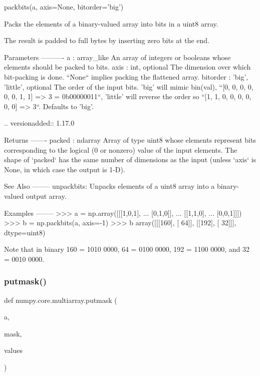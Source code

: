 \begin{DoxyVerb}packbits(a, axis=None, bitorder='big')

Packs the elements of a binary-valued array into bits in a uint8 array.

The result is padded to full bytes by inserting zero bits at the end.

Parameters
----------
a : array_like
    An array of integers or booleans whose elements should be packed to
    bits.
axis : int, optional
    The dimension over which bit-packing is done.
    ``None`` implies packing the flattened array.
bitorder : {'big', 'little'}, optional
    The order of the input bits. 'big' will mimic bin(val),
    ``[0, 0, 0, 0, 0, 0, 1, 1] => 3 = 0b00000011``, 'little' will
    reverse the order so ``[1, 1, 0, 0, 0, 0, 0, 0] => 3``.
    Defaults to 'big'.

    .. versionadded:: 1.17.0

Returns
-------
packed : ndarray
    Array of type uint8 whose elements represent bits corresponding to the
    logical (0 or nonzero) value of the input elements. The shape of
    `packed` has the same number of dimensions as the input (unless `axis`
    is None, in which case the output is 1-D).

See Also
--------
unpackbits: Unpacks elements of a uint8 array into a binary-valued output
            array.

Examples
--------
>>> a = np.array([[[1,0,1],
...                [0,1,0]],
...               [[1,1,0],
...                [0,0,1]]])
>>> b = np.packbits(a, axis=-1)
>>> b
array([[[160],
        [ 64]],
       [[192],
        [ 32]]], dtype=uint8)

Note that in binary 160 = 1010 0000, 64 = 0100 0000, 192 = 1100 0000,
and 32 = 0010 0000.\end{DoxyVerb}
 \mbox{\label{namespacenumpy_1_1core_1_1multiarray_a170d0890b78c0b73506f557579f30b95}} 
\subsubsection{\texorpdfstring{putmask()}{putmask()}}
{\footnotesize\ttfamily def numpy.\+core.\+multiarray.\+putmask (\begin{DoxyParamCaption}\item[{}]{a,  }\item[{}]{mask,  }\item[{}]{values }\end{DoxyParamCaption})}

